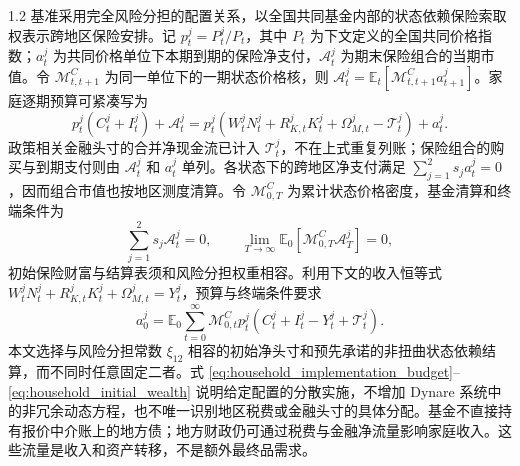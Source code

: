 \documentclass[12pt,UTF8]{ctexart}
\newcommand{\E}{\mathbb{E}}
\begin{document}
\begin{spacing}{1.2}
		基准采用完全风险分担的配置关系，以全国共同基金内部的状态依赖保险索取权表示跨地区保险安排。记 $p_t^j=P_t^j/P_t$，其中 $P_t$ 为下文定义的全国共同价格指数；$a_t^j$ 为共同价格单位下本期到期的保险净支付，$\mathcal A_t^j$ 为期末保险组合的当期市值。令 $\mathcal M_{t,t+1}^C$ 为同一单位下的一期状态价格核，则 $\mathcal A_t^j=\E_t[\mathcal M_{t,t+1}^C a_{t+1}^j]$。家庭逐期预算可紧凑写为
		\begin{equation}
			p_t^j(C_t^j+I_t^j)+\mathcal A_t^j
			=p_t^j\left(W_t^jN_t^j+R_{K,t}^jK_t^j+\Omega_{M,t}^j-\mathcal T_t^j\right)+a_t^j.
			\label{eq:household_implementation_budget}
		\end{equation}
		政策相关金融头寸的合并净现金流已计入 $\mathcal T_t^j$，不在上式重复列账；保险组合的购买与到期支付则由 $\mathcal A_t^j$ 和 $a_t^j$ 单列。各状态下的跨地区净支付满足 $\sum_{j=1}^2s_ja_t^j=0$，因而组合市值也按地区测度清算。令 $\mathcal M_{0,T}^{C}$ 为累计状态价格密度，基金清算和终端条件为
		\begin{equation}
			\sum_{j=1}^2s_j\mathcal A_t^j=0,
			\qquad
			\lim_{T\to\infty}\E_0\left[\mathcal M_{0,T}^{C}\mathcal A_T^j\right]=0,
			\label{eq:fund_clearing_tvc}
		\end{equation}
		初始保险财富与结算表须和风险分担权重相容。利用下文的收入恒等式 $W_t^jN_t^j+R_{K,t}^jK_t^j+\Omega_{M,t}^j=Y_t^j$，预算与终端条件要求
		\begin{equation}
			a_0^j=\E_0\sum_{t=0}^{\infty}\mathcal M_{0,t}^{C}p_t^j
			\left(C_t^j+I_t^j-Y_t^j+\mathcal T_t^j\right).
			\label{eq:household_initial_wealth}
		\end{equation}
		本文选择与风险分担常数 $\xi_{12}$ 相容的初始净头寸和预先承诺的非扭曲状态依赖结算，而不同时任意固定二者。式 \eqref{eq:household_implementation_budget}--\eqref{eq:household_initial_wealth} 说明给定配置的分散实施，不增加 Dynare 系统中的非冗余动态方程，也不唯一识别地区税费或金融头寸的具体分配。基金不直接持有报价中介账上的地方债；地方财政仍可通过税费与金融净流量影响家庭收入。这些流量是收入和资产转移，不是额外最终品需求。


\end{spacing}
\end{document}
